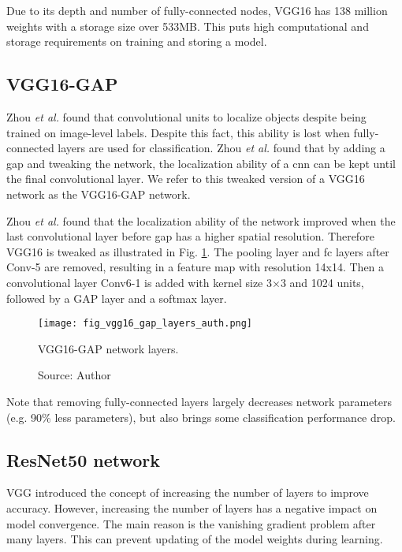 Due to its depth and number of fully-connected nodes, VGG16 has 138 million weights with a storage size over 533MB. This puts high computational and storage requirements on training and storing a model.

\subsection{VGG16-GAP}
Zhou \textit{et al.} \cite{zhou2016cvpr} found that convolutional units to localize objects despite being trained on image-level labels. Despite this fact, this ability is lost when fully-connected layers are used for classification. Zhou \textit{et al.} found that by adding a \acrshort{gap} and tweaking the network, the localization ability of a \acrshort{cnn} can be kept until the final convolutional layer. We refer to this tweaked version of a VGG16 network as the VGG16-GAP network.

Zhou \textit{et al.} found that the localization ability of the network improved when the last convolutional layer before \acrshort{gap} has a higher spatial resolution. Therefore VGG16 is tweaked as illustrated in Fig. \ref{fig:vgg16_gap_layers_auth}. The pooling layer and \acrshort{fc} layers after Conv-5 are removed, resulting in a feature map with resolution 14x14. Then a convolutional layer Conv6-1 is added with kernel size 3×3 and 1024 units, followed by a GAP layer and a softmax layer.
\begin{figure}[ht]
    \begin{center}       
    \texttt{[image: fig\_vgg16\_gap\_layers\_auth.png]}
    \caption[VGG16-GAP network layers]{VGG16-GAP network layers.}
    \caption*{Source: Author}
    \label{fig:vgg16_gap_layers_auth}
    \end{center}
\end{figure}

Note that removing fully-connected layers largely decreases network parameters (e.g. 90\% less parameters), but also brings some classification performance drop.


\subsection{ResNet50 network}
VGG introduced the concept of increasing the number of layers to improve accuracy. However, increasing the number of layers has a negative impact on model convergence. The main reason is the vanishing gradient problem after many layers. This can prevent updating of the model weights during learning.

